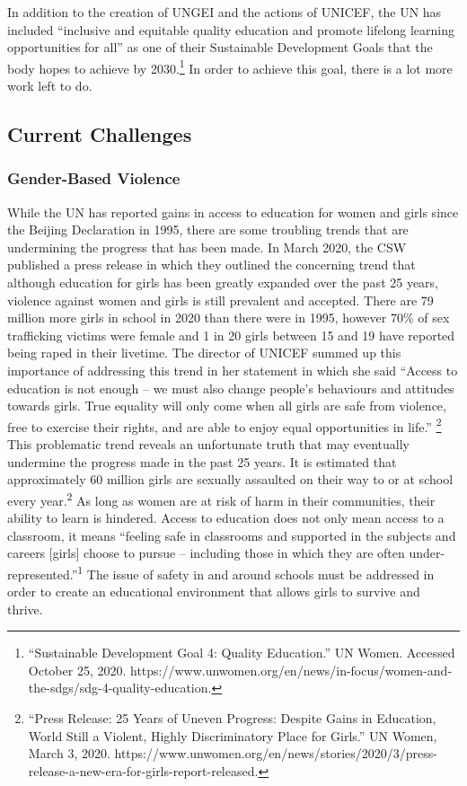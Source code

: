 \documentclass[10pt, letterpaper]{article}
\begin{document}
In addition to the creation of UNGEI and the actions of UNICEF, the UN
has included ``inclusive and equitable quality education and promote
lifelong learning opportunities for all'' as one of their Sustainable
Development Goals that the body hopes to achieve by 2030.\footnote{``Sustainable
  Development Goal 4: Quality Education.'' UN Women. Accessed October
  25, 2020.
  https://www.unwomen.org/en/news/in-focus/women-and-the-sdgs/sdg-4-quality-education.}
In order to achieve this goal, there is a lot more work left to do. \\

\subsection{Current Challenges}

\subsubsection{Gender-Based Violence}

While the UN has reported gains in access to education for women and
girls since the Beijing Declaration in 1995, there are some troubling
trends that are undermining the progress that has been made. In March
2020, the CSW published a press release in which they outlined the
concerning trend that although education for girls has been greatly
expanded over the past 25 years, violence against women and girls is
still prevalent and accepted. There are 79 million more girls in school
in 2020 than there were in 1995, however 70\% of sex trafficking victims
were female and 1 in 20 girls between 15 and 19 have reported being
raped in their livetime. The director of UNICEF summed up this
importance of addressing this trend in her statement in which she said
``Access to education is not enough -- we must also change people's
behaviours and attitudes towards girls. True equality will only come
when all girls are safe from violence, free to exercise their rights,
and are able to enjoy equal opportunities in life.'' \footnote{``Press
  Release: 25 Years of Uneven Progress: Despite Gains in Education,
  World Still a Violent, Highly Discriminatory Place for Girls.'' UN
  Women, March 3, 2020.
  https://www.unwomen.org/en/news/stories/2020/3/press-release-a-new-era-for-girls-report-released.} \\

This problematic trend reveals an unfortunate truth that may eventually
undermine the progress made in the past 25 years. It is estimated that
approximately 60 million girls are sexually assaulted on their way to or
at school every year.\textsuperscript{2} As long as women are at risk of
harm in their communities, their ability to learn is hindered. Access to
education does not only mean access to a classroom, it means ``feeling
safe in classrooms and supported in the subjects and careers {[}girls{]}
choose to pursue -- including those in which they are often
under-represented.''\textsuperscript{1} The issue of safety in and
around schools must be addressed in order to create an educational
environment that allows girls to survive and thrive.
\end{document}

